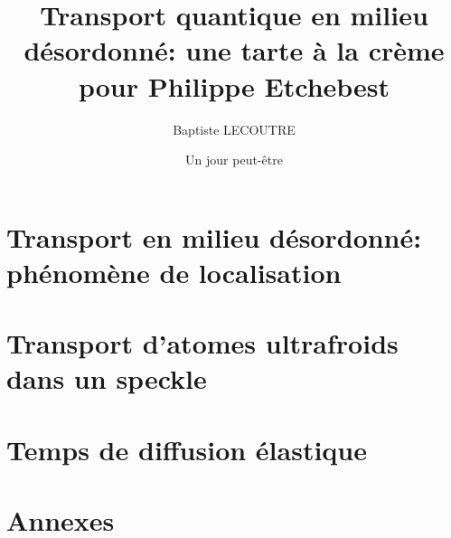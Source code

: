 \documentclass[a4paper, 11pt,twoside,openright]{book}
\title{Transport quantique en milieu désordonné: une tarte à la crème pour Philippe Etchebest}
\author{Baptiste LECOUTRE}
\institute{Institut d'Optique Graduate School}
\date{Un jour peut-être}
\begin{document}
{\hypersetup{linkcolor=black}
\tableofcontents}


\part{Transport en milieu désordonné: phénomène de localisation}

\stopcontents

\part{Transport d'atomes ultrafroids dans un speckle} 



\stopcontents

\part{Temps de diffusion élastique}


\stopcontents




\part{Annexes}
\appendix


\stopcontents

% 

 
\end{document}
